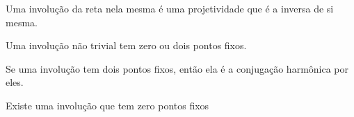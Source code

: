 \begin{defn}
Uma involução da reta nela mesma é uma projetividade que é a inversa de si mesma.
\end{defn}

\begin{thm}
Uma involução não trivial tem zero ou dois pontos fixos. 
\end{thm}

\begin{thm}
Se uma involução tem dois pontos fixos, então ela é a conjugação harmônica por eles.
\end{thm}

\begin{prop}
  Existe uma involução que tem zero pontos fixos
\end{prop}
